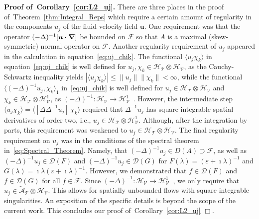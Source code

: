 \documentclass[leqno,onefignum,onetabnum]{siamltex1213}
\newcommand{\thmref}[1]{Theorem~\ref{#1}}
\newcommand{\corref}[1]{Corollary~\ref{#1}}
\newcommand{\Tc}{\mathcal{T}}
\newcommand{\Vc}{\mathcal{V}}
\newcommand{\Hs}{\mathscr{H}}
\newcommand{\As}{\mathscr{A}}
\newcommand{\Ds}{\mathscr{D}}
\newcommand{\Fs}{\mathscr{F}}
\newcommand\bnabla{\mbox{\boldmath${\nabla}$}}
\providecommand\bcdot{\boldsymbol{\cdot}}
\newcommand{\vecu}{\boldsymbol{u}}
\begin{document}
\textbf{Proof of~\corref{cor:L2_uj}.}\hspace{1ex}
%
There are three places in the proof of~\thmref{thm:Integral_Reps}
which require a certain amount of regularity in the components $u_j$
of the fluid velocity field $\vecu$. One requirement was that the
operator 
$(-\Delta)^{-1}[\vecu\bcdot\bnabla]$ be bounded on $\Fs$ so that $A$ is a
maximal (skew-symmetric) normal operator on $\Fs$. Another regularity
requirement of $u_j$ appeared in the calculation in
equation~\eqref{eq:uj_chik}. The functional 
$\langle u_j\chi_k\rangle$ in equation~\eqref{eq:uj_chik} is well defined for
$u_j,\chi_k\in\Hs_{\Tc}\otimes\Hs_{\Vc}$, as the Cauchy-Schwartz inequality yields
$|\langle u_j\chi_k\rangle|\leq\|u_j\|\|\chi_k\|<\infty$, while the functional
$\langle(-\Delta)^{-1}u_j,\chi_k\rangle_1$ in~\eqref{eq:uj_chik} is well defined for
$u_j\in\Hs_{\Tc}\otimes\Hs_{\Vc}$ and $\chi_k\in\Hs_{\Tc}\otimes\Hs^1_{\Vc}$, as
$(-\Delta)^{-1}:\Hs_{\Vc}\to\Hs^1_{\Vc}$~\cite{Bhattacharya:AAP:1999:951}. However,
the intermediate step 
$\langle u_j\chi_k\rangle=\langle[\Delta\Delta^{-1}u_j]\,\chi_k\rangle$ required that $\Delta^{-1}u_j$ has square
integrable spatial derivatives of order two, i.e.,
$u_j\in\Hs_{\Tc}\otimes\Hs^1_{\Vc}$. Although, after the integration by parts,
this requirement was weakened to $u_j\in\Hs_{\Tc}\otimes\Hs_{\Vc}$. The final
regularity requirement on $u_j$ was in the conditions of the spectral
theorem in~\eqref{eq:Spectral_Theorem}. Namely, that
$(-\Delta)^{-1}u_j\in D(A)\supset\Fs$, as well as $(-\Delta)^{-1}u_j\in\Ds(F)$
and $(-\Delta)^{-1}u_j\in\Ds(G)$ for $F(\lambda)=(\varepsilon+\imath\lambda)^{-1}$ and
$G(\lambda)=\imath\lambda(\varepsilon+\imath\lambda)^{-1}$. However, we demonstrated that $f\in\Ds(F)$ and 
$f\in\Ds(G)$ for all $f\in\Fs$. Since
$(-\Delta)^{-1}:\Hs_{\Vc}\to\Hs^1_{\Vc}$~\cite{Bhattacharya:AAP:1999:951}, 
we only require that $u_j\in\tilde{\As}_{\Tc}\otimes\Hs_{\Vc}$.  This allows for
spatially unbounded flows with square integrable singularities. An
exposition of the specific details is beyond the scope of the current
work. This concludes our proof of~\corref{cor:L2_uj} $\Box$.
\end{document}
